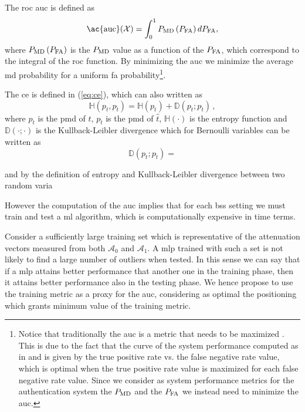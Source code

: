 \documentclass[twocolumns]{IEEEtran}
\begin{document}
The \ac{roc} \ac{auc} is defined as 
\begin{equation}
    \text{\ac{auc}}(\mathcal{X}) = \int_{0}^{1} P_{\rm MD}\left(P_{\rm FA}\right) d P_{\rm FA},
\end{equation}
where $P_{\rm MD}\left(P_{\rm FA}\right)$ is the $P_{\rm MD}$ value as a function of the $P_{\rm FA}$, which correspond to the integral of the \ac{roc} function. By minimizing the \ac{auc} we minimize the average \ac{md} probability for a uniform \ac{fa} probability\footnote{Notice that traditionally the \ac{auc} is a metric that needs to be maximized \cite{hanley-82}. This is due to the fact that the curve of the system performance computed as in \cite{hanley-82} and \cite{Kennedy-11} is given by the true positive rate vs. the false negative rate value, which is optimal when the true positive rate value is maximized for each false negative rate value. Since we consider as system performance metrics for the authentication system the $P_{\rm MD}$ and the $P_{\rm FA}$ we instead need to minimize the \ac{auc}.}. 

The \ac{ce} is defined in (\ref{eq:ce}), which can also written as 
\begin{equation}
\mathbb H(p_t,p_{\hat{t}}) = \mathbb H(p_t) + \mathbb D(p_t; p_{\hat{t}})\,,
\end{equation}
where $p_t$ is the \ac{pmd} of $t$, $p_{\hat{t}}$ is the \ac{pmd} of $\hat{t}$, $\mathbb H(\cdot)$ is the entropy function and $\mathbb D(\cdot;\cdot)$ is the Kullback-Leibler divergence which for Bernoulli variables can be written as 
\begin{equation}
\mathbb D(p_t; p_{\hat{t}}) = 
\end{equation}

and by the definition of entropy and Kullback-Leibler divergence between two random varia

However the computation of the \ac{auc} implies that for each \acp{bs} setting we must train and test a \ac{ml} algorithm, which is computationally expensive in time terms. 

Consider a sufficiently large training set which is representative of the attenuation vectors measured from both $\mathcal{A}_0$ and $\mathcal{A}_1$. A \ac{mlp} trained with such a set is not likely to find a large number of outliers when tested. In this sense we can say that if a \ac{mlp} attains better performance that another one in the training phase, then it attains better performance also in the testing phase. We hence propose to use the training metric as a proxy for the \ac{auc}, considering as optimal the positioning which grants minimum value of the training metric.
\end{document}
